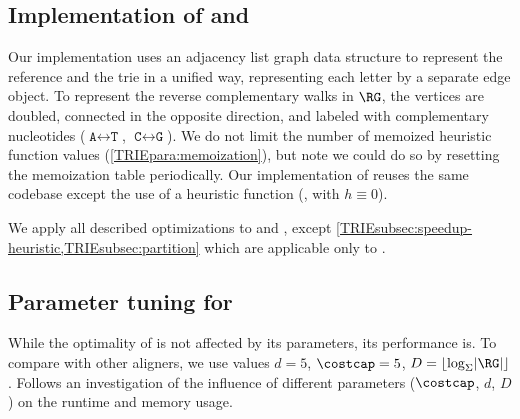 \subsection{Implementation of \astarix and \dijkstra}
Our \astarix implementation uses an adjacency list graph data structure to
represent the reference and the trie in a unified way, representing each letter
by a separate edge object.
To represent the reverse complementary walks in $\RG$, the vertices are doubled,
connected in the opposite direction, and labeled with complementary nucleotides
($\texttt{A} \leftrightarrow \texttt{T}$, $\texttt{C} \leftrightarrow
\texttt{G}$).
%
We do not limit the number of memoized heuristic function values
(\cref{TRIEpara:memoization}), but note we could do so by resetting the memoization
table periodically.
%
Our implementation of \dijkstra reuses the same \astarix codebase except the
use of a heuristic function (\ie, with $h \equiv 0$).

We apply all described optimizations to \astarix and \dijkstra, except
\cref{TRIEsubsec:speedup-heuristic,TRIEsubsec:partition} which are applicable only to
\astarix.

\subsection{Parameter tuning for \astarix} \label{TRIEsubsec:parameter_estimation}

While the optimality of \astarix is not affected by its parameters, its
performance is. To compare with other aligners, we use values \mbox{$d=5$},
\mbox{$\costcap=5$}, \mbox{$D = \lfloor \log_\Sigma \lvert \RG \rvert \rfloor$}.
Follows an investigation of the influence of different parameters ($\costcap$,
$d$, $D$) on the runtime and memory usage.


